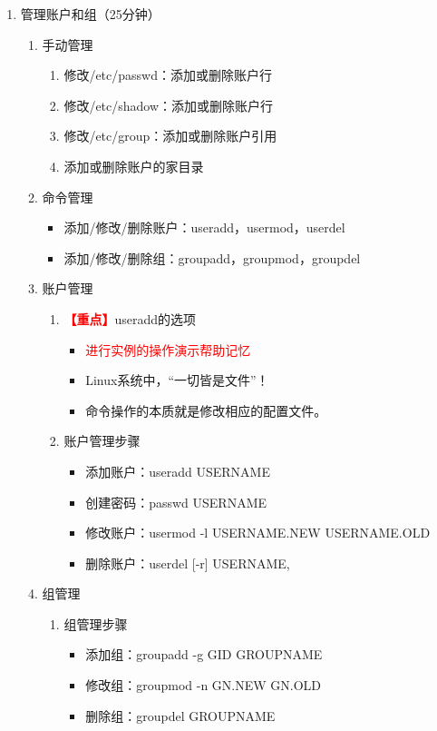 \documentclass{TIJMUjiaoanLL}
\begin{document}
\begin{enumerate}
  \item 管理账户和组（25分钟）
    \begin{enumerate}
      \item 手动管理
	\begin{enumerate}
          \item 修改/etc/passwd：添加或删除账户行
          \item 修改/etc/shadow：添加或删除账户行
          \item 修改/etc/group：添加或删除账户引用
          \item 添加或删除账户的家目录
	\end{enumerate}
      \item 命令管理
	\begin{itemize}
	  \item 添加/修改/删除账户：useradd，usermod，userdel
	  \item 添加/修改/删除组：groupadd，groupmod，groupdel
	\end{itemize}
      \item 账户管理
	\begin{enumerate}
	  \item \textcolor{red}{\textbf{【重点】}}useradd的选项
	    \begin{itemize}
	      \item \textcolor{red}{进行实例的操作演示帮助记忆}
	      \item Linux系统中，“一切皆是文件”！
	      \item 命令操作的本质就是修改相应的配置文件。
	    \end{itemize}

	  \item 账户管理步骤
	    \begin{itemize}
	      \item 添加账户：useradd USERNAME
	      \item 创建密码：passwd USERNAME
	      \item 修改账户：usermod -l USERNAME.NEW USERNAME.OLD
	      \item 删除账户：userdel [-r] USERNAME,
	    \end{itemize}
	\end{enumerate}
      \item 组管理
	\begin{enumerate}
	  \item 组管理步骤
	    \begin{itemize}
	      \item 添加组：groupadd -g GID GROUPNAME
	      \item 修改组：groupmod -n GN.NEW GN.OLD
	      \item 删除组：groupdel GROUPNAME
	    \end{itemize}
	\end{enumerate}
    \end{enumerate}


\end{enumerate}
\end{document}
